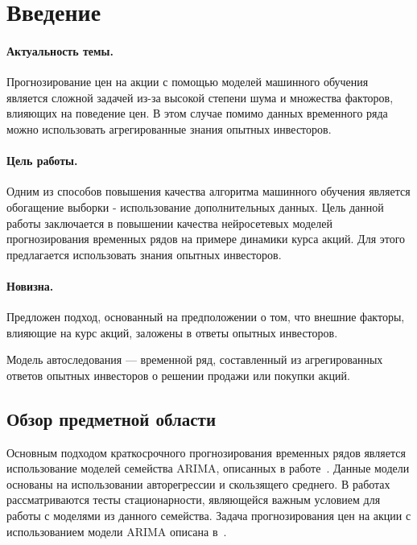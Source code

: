 \newpage

\section{Введение}

\paragraph{Актуальность темы.} 
Прогнозирование цен на акции с помощью моделей машинного обучения является сложной задачей из-за высокой степени шума и множества факторов, влияющих на поведение цен.
В этом случае помимо данных временного ряда можно использовать агрегированные знания опытных инвесторов.

\paragraph{Цель работы.} Одним из способов повышения качества алгоритма машинного обучения является обогащение выборки - использование дополнительных данных. Цель данной работы заключается в повышении качества нейросетевых моделей прогнозирования временных рядов на примере динамики курса акций. Для этого предлагается использовать знания опытных инвесторов.

\paragraph{Новизна.}
Предложен подход, основанный на предположении о том, что внешние факторы, влияющие на курс акций, заложены в ответы опытных инвесторов.

\begin{definition}
Модель автоследования --- временной ряд, составленный из агрегированных ответов опытных инвесторов о решении продажи или покупки акций.
\end{definition}

\begin{comment}
\begin{definition}
Тестируемая модель --- модель, при обучении которой используются ответы модели автоследования.
\end{definition}
\end{comment}

\subsection{Обзор предметной области}

Основным подходом краткосрочного прогнозирования временных рядов является использование моделей семейства ARIMA, описанных в работе~\cite{ARIMA}. Данные модели основаны на использовании авторегрессии и скользящего среднего. В работах~\cite{Критерии стационарности 1, Критерии стационарности 2} рассматриваются тесты стационарности, являющейся важным условием для работы с моделями из данного семейства. Задача прогнозирования цен на акции с использованием модели ARIMA описана в~\cite{Stock price ARIMA}.

